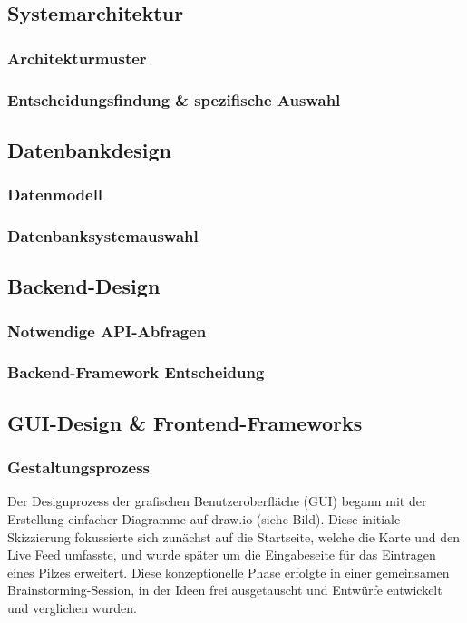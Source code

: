 \documentclass[../main.tex]{subfiles}
\begin{document}
\subsection{Systemarchitektur} %
\subsubsection{Architekturmuster}
\subsubsection{Entscheidungsfindung \& spezifische Auswahl}

\subsection{Datenbankdesign} %
\subsubsection{Datenmodell}
\subsubsection{Datenbanksystemauswahl}

\subsection{Backend-Design} %
\subsubsection{Notwendige API-Abfragen}
\subsubsection{Backend-Framework Entscheidung}

\subsection{GUI-Design \& Frontend-Frameworks} %
\subsubsection{Gestaltungsprozess}
Der Designprozess der grafischen Benutzeroberfläche (GUI) begann mit der Erstellung einfacher Diagramme auf 
draw.io (siehe Bild). Diese initiale Skizzierung fokussierte sich zunächst auf die Startseite, welche die Karte und den Live 
Feed umfasste, und wurde später um die Eingabeseite für das Eintragen eines Pilzes erweitert. Diese konzeptionelle Phase 
erfolgte in einer gemeinsamen Brainstorming-Session, in der Ideen frei ausgetauscht und Entwürfe entwickelt und verglichen 
wurden.
\end{document}
